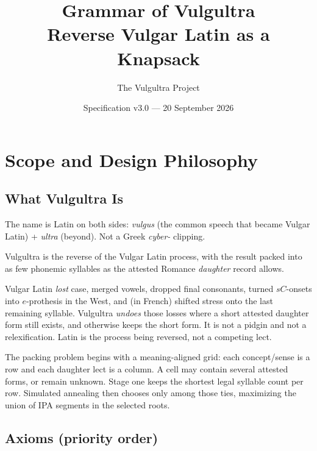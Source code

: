 \documentclass[12pt]{book}
\title{Grammar of Vulgultra\\[1em]\large Reverse Vulgar Latin as a Knapsack}
\author{The Vulgultra Project}
\date{Specification v3.0 --- 20 September 2026}
\begin{document}
\maketitle
\tableofcontents

\chapter{Scope and Design Philosophy}
\label{ch:scope}

\section{What Vulgultra Is}

The name is Latin on both sides: \emph{vulgus} (the common speech that
became Vulgar Latin) + \emph{ultra} (beyond). Not a Greek \emph{cyber-}
clipping.

Vulgultra is the reverse of the Vulgar Latin process, with the result packed
into as few phonemic syllables as the attested Romance \emph{daughter}
record allows.

Vulgar Latin \emph{lost} case, merged vowels, dropped final consonants,
turned $sC$-onsets into $e$-prothesis in the West, and (in French)
shifted stress onto the last remaining syllable. Vulgultra \emph{undoes}
those losses where a short attested daughter form still exists, and
otherwise keeps the short form. It is not a pidgin and not a
relexification. Latin is the process being reversed, not a competing
lect.

The packing problem begins with a meaning-aligned grid: each concept/sense
is a row and each daughter lect is a column. A cell may contain several
attested forms, or remain unknown. Stage one keeps the shortest legal
syllable count per row. Simulated annealing then chooses only among those
ties, maximizing the union of IPA segments in the selected roots.

\section{Axioms (priority order)}
\end{document}
